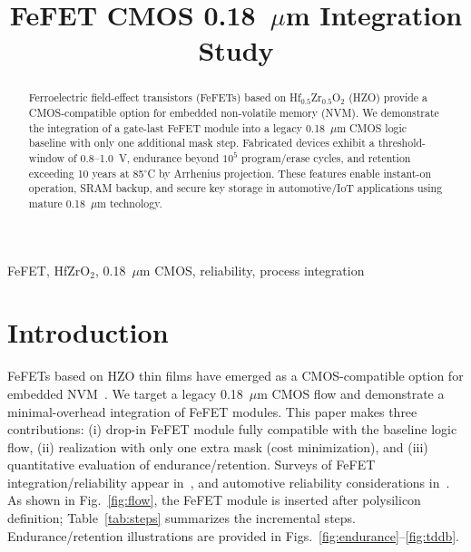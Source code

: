 \documentclass[conference]{IEEEtran}
\begin{document}
\title{FeFET CMOS 0.18~$\mu$m Integration Study}

\author{
}

\maketitle

\begin{abstract}
Ferroelectric field-effect transistors (FeFETs) based on Hf$_{0.5}$Zr$_{0.5}$O$_2$ (HZO) provide a CMOS-compatible option for embedded non-volatile memory (NVM). We demonstrate the integration of a gate-last FeFET module into a legacy 0.18~$\mu$m CMOS logic baseline with only one additional mask step. Fabricated devices exhibit a threshold-window of 0.8--1.0~V, endurance beyond $10^5$ program/erase cycles, and retention exceeding 10 years at 85$^\circ$C by Arrhenius projection. These features enable instant-on operation, SRAM backup, and secure key storage in automotive/IoT applications using mature 0.18~$\mu$m technology.
\end{abstract}

\begin{IEEEkeywords}
FeFET, HfZrO$_2$, 0.18~$\mu$m CMOS, reliability, process integration
\end{IEEEkeywords}

\section{Introduction}
FeFETs based on HZO thin films have emerged as a CMOS-compatible option for embedded NVM~\cite{Boscke2011,Mueller2012,Schenk2019}. We target a legacy 0.18~$\mu$m CMOS flow and demonstrate a minimal-overhead integration of FeFET modules. This paper makes three contributions: (i) drop-in FeFET module fully compatible with the baseline logic flow, (ii) realization with only one extra mask (cost minimization), and (iii) quantitative evaluation of endurance/retention. Surveys of FeFET integration/reliability appear in~\cite{Mueller2015,Park2020}, and automotive reliability considerations in~\cite{Nakamura2003}. As shown in Fig.~\ref{fig:flow}, the FeFET module is inserted after polysilicon definition; Table~\ref{tab:steps} summarizes the incremental steps. Endurance/retention illustrations are provided in Figs.~\ref{fig:endurance}--\ref{fig:tddb}.
\end{document}
